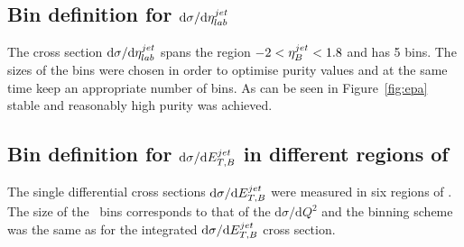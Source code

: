 \subsection{Bin definition for ${\mathrm{d}\sigma}/{\mathrm{d}\mbox{$\eta^{jet}_{lab}$}}$}
\label{subsec:bindefeta}
The cross section ${\mathrm{d}\sigma}/{\mathrm{d}\mbox{$\eta^{jet}_{lab}$}}$ spans the region $-2<\mbox{$\eta_B^{jet}$}<1.8$ and has 5 bins. The sizes of the bins were chosen in order to optimise purity values and at the same time keep an appropriate number of bins. As can be seen in Figure~\ref{fig:epa}~ stable and reasonably high purity was achieved.
\subsection{Bin definition for ${\mathrm{d}\sigma}/{\mathrm{d}\mbox{$E_{T,B}^{jet}$}}$ in different regions of \qsq}
\label{subsec:bindefetinq2}
The single differential cross sections ${\mathrm{d}\sigma}/{\mathrm{d}\mbox{$E_{T,B}^{jet}$}}$ were measured in six regions of \qsq. The size of the \qsq~bins corresponds to that of the ${\mathrm{d}\sigma}/{\mathrm{d}Q^2}$ and the \etjetb binning scheme was the same as for the integrated ${\mathrm{d}\sigma}/{\mathrm{d}\mbox{$E_{T,B}^{jet}$}}$ cross section.


